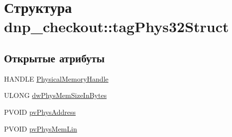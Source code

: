 \hypertarget{structdnp__checkout_1_1tag_phys32_struct}{\section{Структура dnp\-\_\-checkout\-:\-:tag\-Phys32\-Struct}
\label{structdnp__checkout_1_1tag_phys32_struct}
}
\subsection*{Открытые атрибуты}
\begin{DoxyCompactItemize}
\item 
H\-A\-N\-D\-L\-E \hyperlink{structdnp__checkout_1_1tag_phys32_struct_aa241f47b398df59ae03a69e0844578e8}{Physical\-Memory\-Handle}
\item 
U\-L\-O\-N\-G \hyperlink{structdnp__checkout_1_1tag_phys32_struct_a6e967a76e89b8bccbbfe4408b54914a7}{dw\-Phys\-Mem\-Size\-In\-Bytes}
\item 
P\-V\-O\-I\-D \hyperlink{structdnp__checkout_1_1tag_phys32_struct_a2ee2af7f035bdc45e270643c0acc3f87}{pv\-Phys\-Address}
\item 
P\-V\-O\-I\-D \hyperlink{structdnp__checkout_1_1tag_phys32_struct_ab3b4cb40c802f0d4b107a64ff0f875af}{pv\-Phys\-Mem\-Lin}
\end{DoxyCompactItemize}


